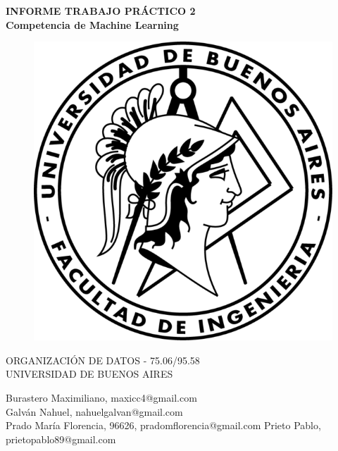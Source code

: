 \documentclass{tcc}
\begin{document}
\pagestyle{empty} %


\begin{center}
\LARGE{\bf INFORME TRABAJO PRÁCTICO 2}\\
\Large{\bf Competencia de Machine Learning}\\
\end{center}


\vspace{1in}
\begin{figure}[H]
\centering
\includegraphics{imagenes/fiuba.png}
\end{figure}

\vspace{1in}

\begin{center}
ORGANIZACIÓN DE DATOS - 75.06/95.58 \\
UNIVERSIDAD DE BUENOS AIRES

\end{center}

\vspace{1in}

\vspace{3em}

\begin{center}
Burastero Maximiliano, maxicc4@gmail.com\\
Galván Nahuel, nahuelgalvan@gmail.com\\
Prado María Florencia, 96626, pradomflorencia@gmail.com
Prieto Pablo, prietopablo89@gmail.com\\
\end{center}
\end{document}

